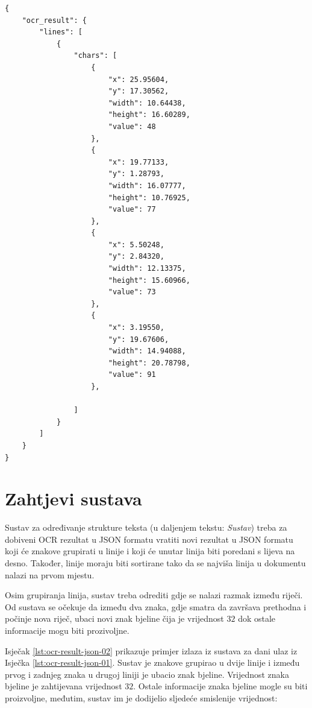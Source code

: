 \documentclass[times, utf8, zavrsni]{fer}
\begin{document}
\pagebreak


\begin{lstlisting}[caption={Primjer OCR rezultata u JSON formatu. Ulaz u sustav za određivanje strukture teksta.},label={lst:ocr-result-json-01}]
{
    "ocr_result": {
        "lines": [
            {
                "chars": [
                    {
                        "x": 25.95604,
                        "y": 17.30562,
                        "width": 10.64438,
                        "height": 16.60289,
                        "value": 48
                    },
                    {
                        "x": 19.77133,
                        "y": 1.28793,
                        "width": 16.07777,
                        "height": 10.76925,
                        "value": 77
                    },
                    {
                        "x": 5.50248,
                        "y": 2.84320,
                        "width": 12.13375,
                        "height": 15.60966,
                        "value": 73
                    },
                    {
                        "x": 3.19550,
                        "y": 19.67606,
                        "width": 14.94088,
                        "height": 20.78798,
                        "value": 91
                    },

                ]
            }
        ]
    }
}
\end{lstlisting}

\pagebreak

\section{Zahtjevi sustava}
Sustav za određivanje strukture teksta (u daljenjem tekstu: \emph{Sustav}) treba za dobiveni OCR rezultat u JSON formatu vratiti novi
rezultat u JSON formatu koji će znakove grupirati u linije i koji će unutar linija biti poredani
s lijeva na desno. Također, linije moraju biti sortirane tako da se najviša linija u dokumentu nalazi
na prvom mjestu.

Osim grupiranja linija, sustav treba odrediti gdje se nalazi razmak između riječi.
Od sustava se očekuje da između dva znaka, gdje smatra da završava prethodna i počinje nova
riječ, ubaci novi znak bjeline čija je vrijednost  $32$ dok ostale informacije
mogu biti prozivoljne.

Isječak \ref{lst:ocr-result-json-02} prikazuje primjer izlaza iz sustava za dani ulaz
iz Isječka \ref{lst:ocr-result-json-01}. Sustav je znakove grupirao u dvije linije i
između prvog i zadnjeg znaka u drugoj liniji je ubacio znak bjeline. Vrijednost znaka
bjeline je zahtijevana vrijednost $32$. Ostale informacije znaka bjeline mogle su biti
proizvoljne, međutim, sustav im je dodijelio sljedeće smislenije vrijednost:
\end{document}
